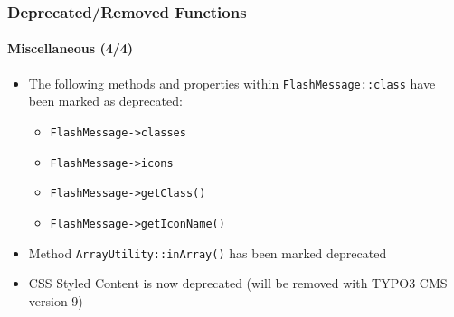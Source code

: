 \begin{frame}[fragile]
	\frametitle{Deprecated/Removed Functions}
	\framesubtitle{Miscellaneous (4/4)}

	\begin{itemize}

		\item The following methods and properties within \texttt{FlashMessage::class}
			have been marked as deprecated:

			\begin{itemize}
				\item \texttt{FlashMessage->classes}
				\item \texttt{FlashMessage->icons}
				\item \texttt{FlashMessage->getClass()}
				\item \texttt{FlashMessage->getIconName()}
			\end{itemize}

		\item Method \texttt{ArrayUtility::inArray()} has been marked deprecated

		\item CSS Styled Content is now deprecated\newline
			\small(will be removed with TYPO3 CMS version 9)\normalsize

	\end{itemize}

\end{frame}


